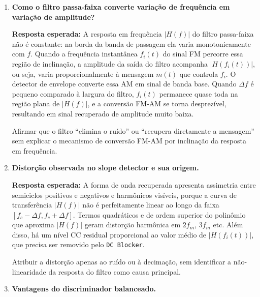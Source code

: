 \documentclass[11pt,a4paper]{article}
\begin{document}
\begin{enumerate}[label=\textbf{Q\arabic*.}, leftmargin=*, itemsep=1em]

  \item \textbf{Como o filtro passa-faixa converte variação de frequência em variação de amplitude?}

    \textbf{Resposta esperada:} A resposta em frequência $|H(f)|$ do filtro
    passa-faixa não é constante: na borda da banda de passagem ela varia
    monotonicamente com $f$. Quando a frequência instantânea $f_i(t)$ do
    sinal FM percorre essa região de inclinação, a amplitude da saída do
    filtro acompanha $|H(f_i(t))|$, ou seja, varia proporcionalmente à
    mensagem $m(t)$ que controla $f_i$. O detector de envelope converte essa
    AM em sinal de banda base. Quando $\Delta f$ é pequeno comparado à
    largura do filtro, $f_i(t)$ permanece quase toda na região plana de
    $|H(f)|$, e a conversão FM-AM se torna desprezível, resultando em sinal
    recuperado de amplitude muito baixa.

    \begin{nota}
      Afirmar que o filtro ``elimina o ruído'' ou ``recupera diretamente a
      mensagem'' sem explicar o mecanismo de conversão FM-AM por inclinação
      da resposta em frequência.
    \end{nota}

  \item \textbf{Distorção observada no slope detector e sua origem.}

    \textbf{Resposta esperada:} A forma de onda recuperada apresenta
    assimetria entre semiciclos positivos e negativos e harmônicos visíveis,
    porque a curva de transferência $|H(f)|$ não é perfeitamente linear ao
    longo da faixa $[f_c - \Delta f, f_c + \Delta f]$. Termos quadráticos e
    de ordem superior do polinômio que aproxima $|H(f)|$ geram distorção
    harmônica em $2 f_m$, $3 f_m$ etc. Além disso, há um nível CC residual
    proporcional ao valor médio de $|H(f_i(t))|$, que precisa ser removido
    pelo \texttt{DC Blocker}.

    \begin{nota}
      Atribuir a distorção apenas ao ruído ou à decimação, sem identificar
      a não-linearidade da resposta do filtro como causa principal.
    \end{nota}

  \item \textbf{Vantagens do discriminador balanceado.}


\end{enumerate}
\end{document}
